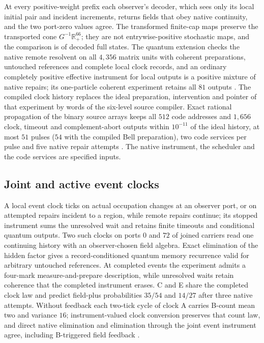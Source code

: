 \documentclass[11pt]{article}
\theoremstyle{definition}
\theoremstyle{remark}
\theoremstyle{plain}
\begin{document}
At every positive-weight prefix each observer's decoder, which sees only
its local initial pair and incident increments, returns fields that obey
native continuity, and the two port-zero values agree. The transformed
finite-cap maps preserve the transported cone $G^{-1}\mathbb R_+^{66}$; they
are not entrywise-positive stochastic maps, and the comparison is of
decoded full states. The quantum extension checks the native remote
resolvent on all $4{,}356$ matrix units with coherent preparations,
untouched references and complete local clock records, and an ordinary
completely positive effective instrument for local outputs is a positive
mixture of native repairs; its one-particle coherent experiment retains all
$81$ outputs \cite{nativeQuantumCorrespondence}. The compiled clock history
replaces the ideal preparation, intervention and pointer of that experiment
by words of the six-level source compiler. Exact rational propagation of
the binary source arrays keeps all $512$ code addresses and $1{,}656$ clock,
timeout and complement-abort outputs within $10^{-11}$ of the ideal
history, at most $51$ pulses ($54$ with the compiled Bell preparation), two
code services per pulse and five native repair attempts
\cite{nativeCompiledClock}. The native instrument, the scheduler and the
code services are specified inputs.

\subsection{Joint and active event clocks}
\label{sec:event-clocks}

A local event clock ticks on actual occupation changes at an observer port,
or on attempted repairs incident to a region, while remote repairs
continue; its stopped instrument sums the unresolved wait and retains finite
timeouts and conditional quantum outputs. Two such clocks on ports $0$ and
$72$ of joined carriers read one continuing history with an
observer-chosen field algebra. Exact elimination of the hidden factor gives
a record-conditioned quantum memory recurrence valid for arbitrary untouched
references. At completed events the experiment admits a four-mark
measure-and-prepare description, while unresolved waits retain coherence
that the completed instrument erases. C and E share the completed clock law
and predict field-plus probabilities $35/54$ and $14/27$ after three native
attempts. Without feedback each two-tick cycle of clock A carries B-count
mean two and variance $16$; instrument-valued clock conversion preserves
that count law, and direct native elimination and elimination through the
joint event instrument agree, including B-triggered field feedback
\cite{nativeJointClock}.
\end{document}
